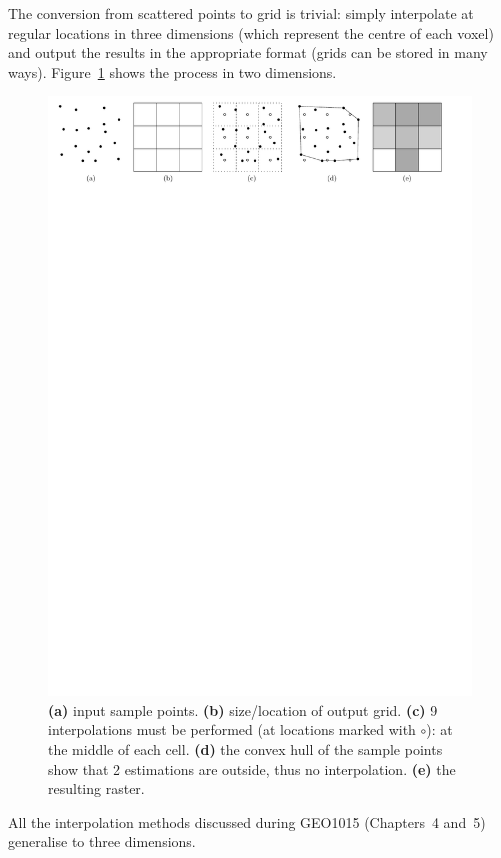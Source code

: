 The conversion from scattered points to grid is trivial: simply interpolate at regular locations in three dimensions (which represent the centre of each voxel) and output the results in the appropriate format (grids can be stored in many ways). 
Figure~\ref{fig:r-interpolation} shows the process in two dimensions.
\begin{figure}
  \centering
  \includegraphics[width=\linewidth]{figs/r-interpolation}
  \caption{\textbf{(a)} input sample points. \textbf{(b)} size/location of output grid. \textbf{(c)} 9 interpolations must be performed (at locations marked with $\circ$): at the middle of each cell. \textbf{(d)} the convex hull of the sample points show that 2 estimations are outside, thus no interpolation. \textbf{(e)} the resulting raster.}%
\label{fig:r-interpolation}
\end{figure}

All the interpolation methods discussed during GEO1015 (Chapters~4 and~5) generalise to three dimensions.


